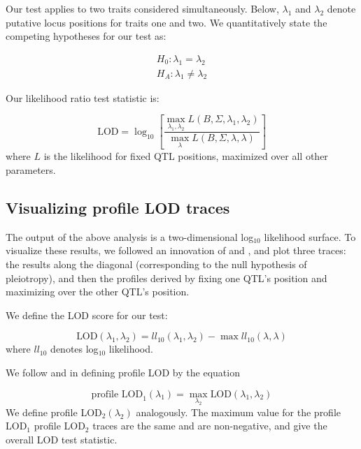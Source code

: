 \documentclass[oneside]{book}\usepackage[]{graphicx}\usepackage[]{color}
\begin{document}
Our test applies to two traits considered simultaneously. Below,
$\lambda_1$ and $\lambda_2$ denote putative locus positions for traits
one and two. We quantitatively state the competing hypotheses for our
test as:

\begin{eqnarray}
H_0: \lambda_1 = \lambda_2 \nonumber\\
H_A: \lambda_1 \neq \lambda_2
\label{eqn:hypotheses}
\end{eqnarray}

\noindent Our likelihood ratio test statistic is:

\begin{equation}
\text{LOD} = \log_{10} \left[ \frac{\max_{\lambda_1, \lambda_2} L(B, \Sigma, \lambda_1, \lambda_2)}{
    \max_\lambda L(B, \Sigma, \lambda, \lambda)} \right]
\label{eqn:test-statistic}
\end{equation}
where $L$ is the likelihood for fixed QTL positions,
maximized over all other parameters.

\subsection{Visualizing profile LOD traces}

The output of the above analysis is a two-dimensional log$_{10}$ likelihood
surface. To visualize these results, we followed an innovation of \citet{zeng2000genetic} and
\citet{tian2016dissection}, and plot three traces: the results along the
diagonal (corresponding to the null hypothesis of pleiotropy), and
then the profiles derived by fixing one QTL's position
and maximizing over the other QTL's position.

We define the LOD score for our test:

\begin{equation}
\text{LOD}(\lambda_1, \lambda_2) = ll_{10}(\lambda_1, \lambda_2) - \max ll_{10}(\lambda, \lambda)
\label{eq:lodpvl}
\end{equation}
where $ll_{10}$ denotes log$_{10}$ likelihood.

We follow \citet{zeng2000genetic} and \citet{tian2016dissection} in
defining profile LOD by the equation

\begin{equation}
\text{profile LOD}_1(\lambda_1) = \max_{\lambda_2}\text{LOD}(\lambda_1, \lambda_2)
\label{eq:profilelod}
\end{equation}
We define profile LOD$_2(\lambda_2)$ analogously.
The maximum value for the profile LOD$_1$
profile LOD$_2$ traces are the same and are non-negative, and give the
overall LOD test statistic.
\end{document}
